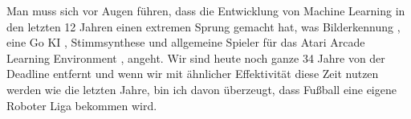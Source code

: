             \noindent
            Man muss sich vor Augen führen, dass die Entwicklung von Machine Learning in den letzten 12 Jahren einen extremen Sprung gemacht hat, was Bilderkennung \cite{NIPS2012_4824}, eine Go KI \cite{go}, Stimmsynthese \cite{wavenet} und allgemeine Spieler für das Atari Arcade Learning Environment \cite{Naddaf2010}, angeht. Wir sind heute noch ganze 34 Jahre von der Deadline entfernt und wenn wir mit ähnlicher Effektivität diese Zeit nutzen werden wie die letzten Jahre, bin ich davon überzeugt, dass Fußball eine eigene Roboter Liga bekommen wird.
